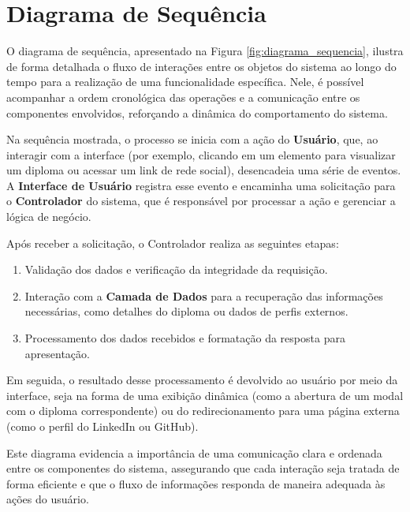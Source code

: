 \clearpage
\section{Diagrama de Sequência}
\label{sec:sequencia}   

O diagrama de sequência, apresentado na Figura \ref{fig:diagrama_sequencia}, ilustra de forma detalhada o fluxo de interações entre os objetos do sistema ao longo do tempo para a realização de uma funcionalidade específica. Nele, é possível acompanhar a ordem cronológica das operações e a comunicação entre os componentes envolvidos, reforçando a dinâmica do comportamento do sistema.

Na sequência mostrada, o processo se inicia com a ação do \textbf{Usuário}, que, ao interagir com a interface (por exemplo, clicando em um elemento para visualizar um diploma ou acessar um link de rede social), desencadeia uma série de eventos. A \textbf{Interface de Usuário} registra esse evento e encaminha uma solicitação para o \textbf{Controlador} do sistema, que é responsável por processar a ação e gerenciar a lógica de negócio.

Após receber a solicitação, o Controlador realiza as seguintes etapas:
\begin{enumerate}
    \item Validação dos dados e verificação da integridade da requisição.
    \item Interação com a \textbf{Camada de Dados} para a recuperação das informações necessárias, como detalhes do diploma ou dados de perfis externos.
    \item Processamento dos dados recebidos e formatação da resposta para apresentação.
\end{enumerate}

Em seguida, o resultado desse processamento é devolvido ao usuário por meio da interface, seja na forma de uma exibição dinâmica (como a abertura de um modal com o diploma correspondente) ou do redirecionamento para uma página externa (como o perfil do LinkedIn ou GitHub).

Este diagrama evidencia a importância de uma comunicação clara e ordenada entre os componentes do sistema, assegurando que cada interação seja tratada de forma eficiente e que o fluxo de informações responda de maneira adequada às ações do usuário.

